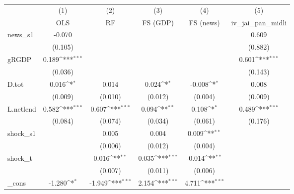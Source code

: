 {
\def\sym#1{\ifmmode^{#1}\else\(^{#1}\)\fi}
\begin{tabular}{l*{5}{c}}
\toprule
            &\multicolumn{1}{c}{(1)}&\multicolumn{1}{c}{(2)}&\multicolumn{1}{c}{(3)}&\multicolumn{1}{c}{(4)}&\multicolumn{1}{c}{(5)}\\
            &\multicolumn{1}{c}{OLS}&\multicolumn{1}{c}{RF}&\multicolumn{1}{c}{FS (GDP)}&\multicolumn{1}{c}{FS (news)}&\multicolumn{1}{c}{iv\_jai\_pan\_midli}\\
\midrule
news\_s1     &      -0.070         &                     &                     &                     &       0.609         \\
            &     (0.105)         &                     &                     &                     &     (0.882)         \\
\addlinespace
gRGDP       &       0.189\sym{***}&                     &                     &                     &       0.601\sym{***}\\
            &     (0.036)         &                     &                     &                     &     (0.143)         \\
\addlinespace
D.tot       &       0.016\sym{*}  &       0.014         &       0.024\sym{*}  &      -0.008\sym{*}  &       0.008         \\
            &     (0.009)         &     (0.010)         &     (0.012)         &     (0.004)         &     (0.009)         \\
\addlinespace
L.netlend   &       0.582\sym{***}&       0.607\sym{***}&       0.094\sym{**} &       0.108\sym{*}  &       0.489\sym{***}\\
            &     (0.084)         &     (0.074)         &     (0.034)         &     (0.061)         &     (0.176)         \\
\addlinespace
shock\_s1    &                     &       0.005         &       0.004         &       0.009\sym{**} &                     \\
            &                     &     (0.006)         &     (0.012)         &     (0.004)         &                     \\
\addlinespace
shock\_t     &                     &       0.016\sym{**} &       0.035\sym{***}&      -0.014\sym{**} &                     \\
            &                     &     (0.007)         &     (0.011)         &     (0.006)         &                     \\
\addlinespace
\_cons      &      -1.280\sym{*}  &      -1.949\sym{***}&       2.154\sym{***}&       4.711\sym{***}&                     \\

\end{tabular}}
